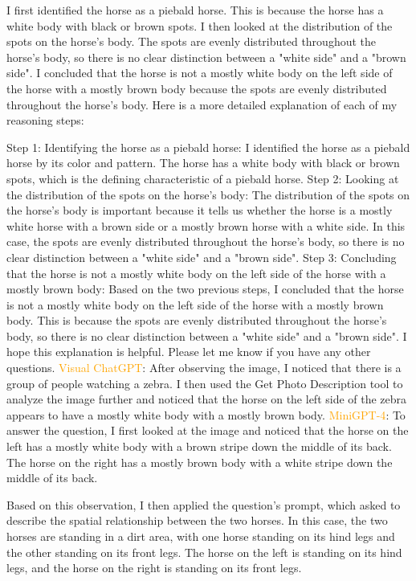 \begin{enumerate}
        I first identified the horse as a piebald horse. This is because the horse has a white body with black or brown spots.
        I then looked at the distribution of the spots on the horse's body. The spots are evenly distributed throughout the horse's body, so there is no clear distinction between a "white side" and a "brown side".
        I concluded that the horse is not a mostly white body on the left side of the horse with a mostly brown body because the spots are evenly distributed throughout the horse's body.
        Here is a more detailed explanation of each of my reasoning steps:
        
        Step 1: Identifying the horse as a piebald horse: I identified the horse as a piebald horse by its color and pattern. The horse has a white body with black or brown spots, which is the defining characteristic of a piebald horse.
        Step 2: Looking at the distribution of the spots on the horse's body: The distribution of the spots on the horse's body is important because it tells us whether the horse is a mostly white horse with a brown side or a mostly brown horse with a white side. In this case, the spots are evenly distributed throughout the horse's body, so there is no clear distinction between a "white side" and a "brown side".
        Step 3: Concluding that the horse is not a mostly white body on the left side of the horse with a mostly brown body: Based on the two previous steps, I concluded that the horse is not a mostly white body on the left side of the horse with a mostly brown body. This is because the spots are evenly distributed throughout the horse's body, so there is no clear distinction between a "white side" and a "brown side".
        I hope this explanation is helpful. Please let me know if you have any other questions.
        \subitem \textcolor{orange}{Visual ChatGPT}: After observing the image, I noticed that there is a group of people watching a zebra. I then used the Get Photo Description tool to analyze the image further and noticed that the horse on the left side of the zebra appears to have a mostly white body with a mostly brown body.
        \subitem \textcolor{orange}{MiniGPT-4}: To answer the question, I first looked at the image and noticed that the horse on the left has a mostly white body with a brown stripe down the middle of its back. The horse on the right has a mostly brown body with a white stripe down the middle of its back.

        Based on this observation, I then applied the question’s prompt, which asked to describe the spatial relationship between the two horses. In this case, the two horses are standing in a dirt area, with one horse standing on its hind legs and the other standing on its front legs. The horse on the left is standing on its hind legs, and the horse on the right is standing on its front legs.
        

\end{enumerate}
